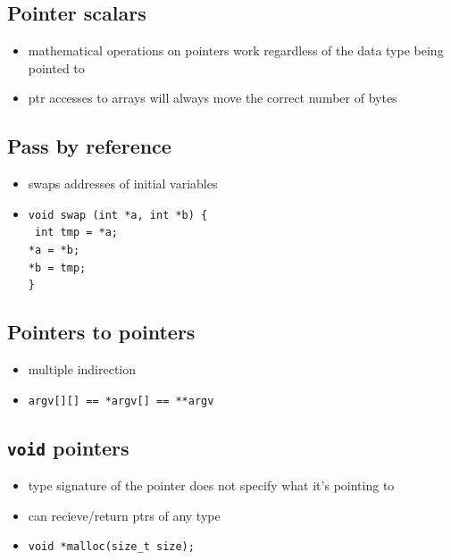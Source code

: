\documentclass[10pt, multicolumn, a4paper]{article}
\begin{document}
\begin{multicols}{2}
	\subsection*{Pointer scalars}
	\begin{itemize}
	\item mathematical operations on pointers work regardless of the data type being pointed to
	\item ptr accesses to arrays will always move the correct number of bytes
	\end{itemize}
	\subsection*{Pass by reference}
	\begin{itemize}
	\item swaps addresses of initial variables
	\item \verb|void swap (int *a, int *b) {| \\ \texttt{\hspace*{5mm} int tmp = *a; \\ \hspace*{5mm}  *a = *b; \\ \hspace*{5mm} *b = tmp;} \\ \verb|}|
	\end{itemize}
	\subsection*{Pointers to pointers}
	\begin{itemize}
	\item multiple indirection
	\item \verb|argv[][] == *argv[] == **argv|
	\end{itemize}
	\subsection*{\texttt{void} pointers}
	\begin{itemize}
	\item type signature of the pointer does not specify what it's pointing to
	\item can recieve/return ptrs of any type
	\item \verb|void *malloc(size_t size);|
	\end{itemize}

\end{multicols}
\end{document}
